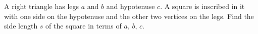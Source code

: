 A right triangle has legs $a$ and $b$ and hypotenuse $c$. A square is inscribed in it with one side on the hypotenuse and the other two vertices on the legs. Find the side length $s$ of the square in terms of $a$, $b$, $c$.
